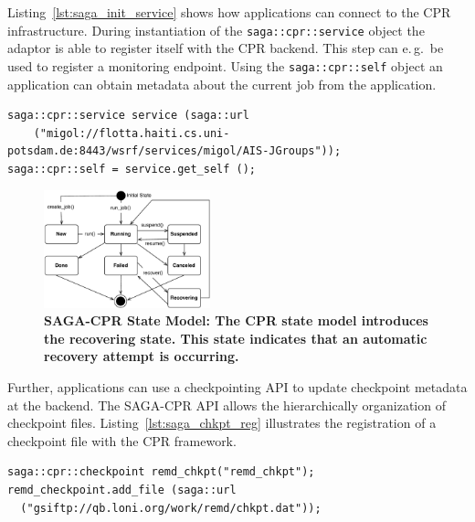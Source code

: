 \documentclass[conference,final]{IEEEtran}
\newcommand{\up}{\vspace*{-1em}}
\newcommand{\upp}{\vspace*{-0.5em}}
\begin{document}
Listing~\ref{lst:saga_init_service} shows how applications can connect
to the CPR infrastructure. During instantiation of the
\texttt{saga::cpr::service} object the adaptor is able to register
itself with the CPR backend. This step can e.\,g.\ be used to register
a monitoring endpoint. Using the \texttt{saga::cpr::self} object an
application can obtain metadata about the current job from the
application.
\begin{lstlisting}[style=myListing, caption={\footnotesize \bf SAGA-CPR: Initialize Migol Session\newline\newline}, float=t, label={lst:saga_init_service}] 
saga::cpr::service service (saga::url 
    ("migol://flotta.haiti.cs.uni-potsdam.de:8443/wsrf/services/migol/AIS-JGroups"));
saga::cpr::self = service.get_self ();
\end{lstlisting}

\begin{figure}[h!]
    \centering
    \upp
        \includegraphics[width=0.43\textwidth]{cpr-statemodel.pdf}
    \caption{\footnotesize \bf SAGA-CPR State Model: The CPR state model introduces the recovering state. This state indicates that an automatic recovery attempt is  occurring.\up}
    \label{fig:cpr-statemodel}
\end{figure}
 

Further, applications can use a checkpointing API to update checkpoint metadata at the backend. The SAGA-CPR API allows the hierarchically 
organization of checkpoint files. 
Listing~\ref{lst:saga_chkpt_reg} illustrates 
the registration of a checkpoint file with the CPR framework.     
\begin{lstlisting}[style=myListing, caption={\footnotesize \bf SAGA-CPR: Checkpoint Registration}, float=t, label={lst:saga_chkpt_reg}]
saga::cpr::checkpoint remd_chkpt("remd_chkpt");
remd_checkpoint.add_file (saga::url 
  ("gsiftp://qb.loni.org/work/remd/chkpt.dat"));
\end{lstlisting}
\end{document}
